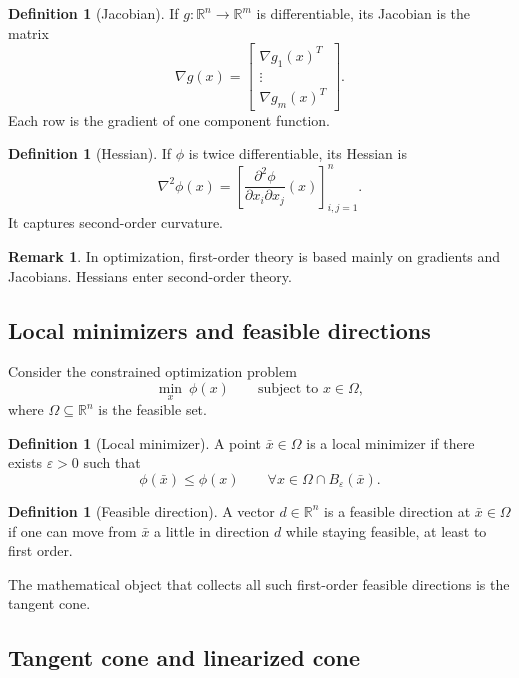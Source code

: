 \documentclass[pdflatex,sn-mathphys-num]{sn-jnl}%
\theoremstyle{definition}
\newtheorem{definition}[theorem]{Definition}
\newtheorem{remark}[theorem]{Remark}
\begin{document}
\begin{definition}[Jacobian]
If $g:\mathbb{R}^n\to\mathbb{R}^m$ is differentiable, its Jacobian is the
matrix
\[
\nabla g(x)=
\begin{bmatrix}
\nabla g_1(x)^T\\
\vdots\\
\nabla g_m(x)^T
\end{bmatrix}.
\]
Each row is the gradient of one component function.
\end{definition}

\begin{definition}[Hessian]
If $\phi$ is twice differentiable, its Hessian is
\[
\nabla^2 \phi(x)=
\left[\frac{\partial^2\phi}{\partial x_i\partial x_j}(x)\right]_{i,j=1}^n.
\]
It captures second-order curvature.
\end{definition}

\begin{remark}
In optimization, first-order theory is based mainly on gradients and
Jacobians. Hessians enter second-order theory.
\end{remark}

\subsection{Local minimizers and feasible directions}

Consider the constrained optimization problem
\[
\min_x \ \phi(x)
\qquad \text{subject to } x\in \Omega,
\]
where $\Omega\subseteq \mathbb{R}^n$ is the feasible set.

\begin{definition}[Local minimizer]
A point $\bar x\in \Omega$ is a local minimizer if there exists $\varepsilon>0$
such that
\[
\phi(\bar x)\le \phi(x)
\qquad
\forall x\in \Omega \cap B_\varepsilon(\bar x).
\]
\end{definition}

\begin{definition}[Feasible direction]
A vector $d\in\mathbb{R}^n$ is a feasible direction at $\bar x\in\Omega$ if
one can move from $\bar x$ a little in direction $d$ while staying feasible,
at least to first order.
\end{definition}

The mathematical object that collects all such first-order feasible
directions is the tangent cone.

\subsection{Tangent cone and linearized cone}
\end{document}

